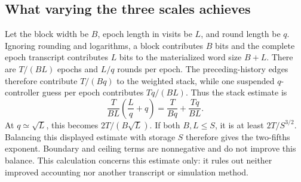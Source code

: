 \subsection{What varying the three scales achieves}
\label{sec:balance}

Let the block width be \(B\), epoch length in visits be \(L\), and
round length be \(q\). Ignoring rounding and logarithms, a block
contributes \(B\) bits and the complete epoch transcript contributes
\(L\) bits to the materialized word size \(B+L\). There are
\(T/(BL)\) epochs and \(L/q\) rounds per epoch. The preceding-history
edges therefore contribute \(T/(Bq)\) to the weighted stack, while
one suspended \(q\)-controller guess per epoch contributes
\(Tq/(BL)\). Thus the stack estimate is
\[
 \frac{T}{BL}\left(\frac Lq+q\right)
 =\frac{T}{Bq}+\frac{Tq}{BL}.
\]
At \(q\simeq\sqrt L\), this becomes \(2T/(B\sqrt L)\).
If both \(B,L\le S\), it is at least \(2T/S^{3/2}\).
Balancing this displayed estimate with storage \(S\) therefore gives
the two-fifths exponent. Boundary and ceiling terms are nonnegative
and do not improve this balance. This calculation concerns this
estimate only: it rules out neither improved accounting nor another
transcript or simulation method.

